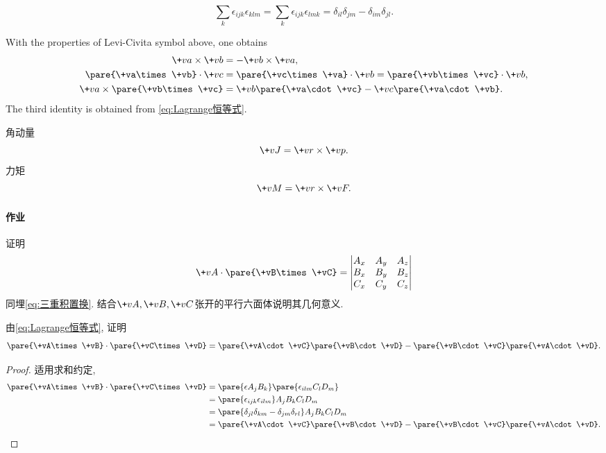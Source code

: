 \documentclass[../LectureNotes.tex]{subfiles}
\begin{document}
\begin{ex}[Lagrange恒等式]
    \begin{equation}
        \label{eq:Lagrange恒等式}
        \sum_k \epsilon_{ijk}\epsilon_{klm} = \sum_k \epsilon_{ijk}\epsilon_{lmk} = \delta_{il}\delta_{jm} - \delta_{im}\delta_{jl}. 
    \end{equation}
\end{ex}
\begin{ex}[矢量积的性质]
    With the properties of Levi-Civita symbol above, one obtains
    \begin{align}
        \+va\times\+vb &= -\+vb\times\+va,\\
        \label{eq:三重积置换}\pare{\+va\times\+vb}\cdot\+vc &= \pare{\+vc\times\+va}\cdot\+vb = \pare{\+vb\times\+vc}\cdot\+vb,\\
        \+va\times\pare{\+vb\times\+vc} &= \+vb\pare{\+va\cdot\+vc} - \+vc\pare{\+va\cdot\+vb}.
    \end{align}
    The third identity is obtained from \eqref{eq:Lagrange恒等式}.
\end{ex}
\begin{ex}
    角动量
    \[ \+vJ = \+vr\times\+vp. \]
    力矩
    \[ \+vM = \+vr\times\+vF. \]
\end{ex}

\paragraph{作业} %
\label{par:作业}

\begin{ex}
    证明
    \[ \+vA\cdot\pare{\+vB\times\+vC} = \begin{vmatrix}
        A_x & A_y & A_z \\
        B_x & B_y & B_z \\
        C_x & C_y & C_z
    \end{vmatrix} \]
    同埋\eqref{eq:三重积置换}. 结合$\+vA,\+vB,\+vC$张开的平行六面体说明其几何意义.
\end{ex}
\begin{ex}
    由\eqref{eq:Lagrange恒等式}, 证明
    \[ \pare{\+vA\times\+vB}\cdot\pare{\+vC\times\+vD} = \pare{\+vA\cdot\+vC}\pare{\+vB\cdot\+vD} - \pare{\+vB\cdot\+vC}\pare{\+vA\cdot\+vD}. \]
\end{ex}
\begin{proof}
    适用求和约定,
    \begin{align*}
        \pare{\+vA\times\+vB} \cdot\pare{\+vC\times\+vD} &= \pare{\epsilon A_jB_k}\pare{\epsilon_{ilm}C_lD_m} \\
        &= \pare{\epsilon_{ijk}\epsilon_{ilm}}A_jB_kC_lD_m \\
        &= \pare{\delta_{jl}\delta_{km} - \delta_{jm}\delta_{rl}}A_jB_kC_lD_m \\
        &= \pare{\+vA\cdot\+vC}\pare{\+vB\cdot\+vD} - \pare{\+vB\cdot\+vC}\pare{\+vA\cdot\+vD}. \qedhere
    \end{align*}
\end{proof}
\end{document}
